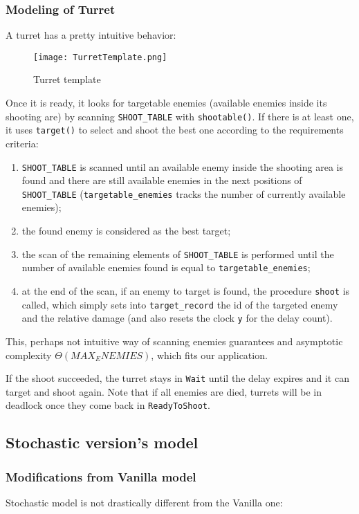 \documentclass[
10pt, %
a4paper, %
oneside, %
headinclude,footinclude, %
BCOR5mm, %
]{scrartcl}
\begin{document}
\subsubsection{Modeling of Turret}
A turret has a pretty intuitive behavior:

\begin{figure}[h!]
	\centering
	\texttt{[image: TurretTemplate.png]}
	\caption{Turret template}
\end{figure}

Once it is ready, it looks for targetable enemies (available enemies inside its shooting are) by scanning \texttt{SHOOT\_TABLE} with \texttt{shootable()}. If there is at least one, it uses \texttt{target()} to select and shoot the best one according to the requirements criteria:
\begin{enumerate}
	\item \texttt{SHOOT\_TABLE} is scanned until an available enemy inside the shooting area is found and there are still available enemies in the next positions of \texttt{SHOOT\_TABLE} (\texttt{targetable\_enemies} tracks the number of currently available enemies);
	\item the found enemy is considered as the best target;
	\item the scan of the remaining elements of \texttt{SHOOT\_TABLE} is performed until the number of available enemies found is equal to \texttt{targetable\_enemies};
	\item at the end of the scan, if an enemy to target is found, the procedure \texttt{shoot} is called, which simply sets into \texttt{target\_record} the id of the targeted enemy and the relative damage (and also resets the clock \texttt{y} for the delay count). 
\end{enumerate}
This, perhaps not intuitive way of scanning enemies guarantees and asymptotic complexity $\Theta(MAX_ENEMIES)$, which fits our application.

If the shoot succeeded, the turret stays in \texttt{Wait} until the delay expires and it can target and shoot again. Note that if all enemies are died, turrets will be in deadlock once they come back in \texttt{ReadyToShoot}.

\subsection{Stochastic version's model}
\subsubsection{Modifications from Vanilla model}
Stochastic model is not drastically different from the Vanilla one:
\end{document}

